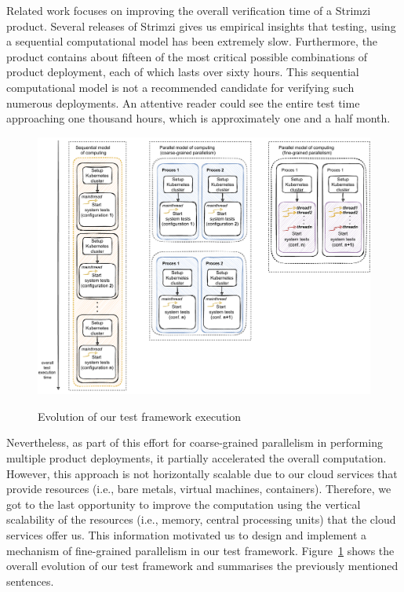 Related work focuses on improving the overall verification time of a Strimzi product.
Several releases of Strimzi gives us empirical insights that testing, using a sequential computational model has been extremely slow.
Furthermore, the product contains about fifteen of the most critical possible combinations of product deployment, each of which lasts over sixty hours.
This sequential computational model is not a recommended candidate for verifying such numerous deployments.
An attentive reader could see the entire test time approaching one thousand hours, which is approximately one and a half month.
\begin{figure}[!ht]
    \centering
    \includegraphics[scale=0.65]{obrazky-figures/01-intro/00-intro-better-one}
    \label{00:fig:evolution}
    \caption{Evolution of our test framework execution}
\end{figure}
Nevertheless, as part of this effort for coarse-grained parallelism in performing multiple product deployments, it partially accelerated the overall computation.
However, this approach is not horizontally scalable due to our cloud services that provide resources (i.e., bare metals, virtual machines, containers).
Therefore, we got to the last opportunity to improve the computation using the vertical scalability of the resources (i.e., memory, central processing units) that the cloud services offer us.
This information motivated us to design and implement a mechanism of fine-grained parallelism in our test framework.
Figure~\ref{00:fig:evolution} shows the overall evolution of our test framework and summarises the previously mentioned sentences.
\bigskip

